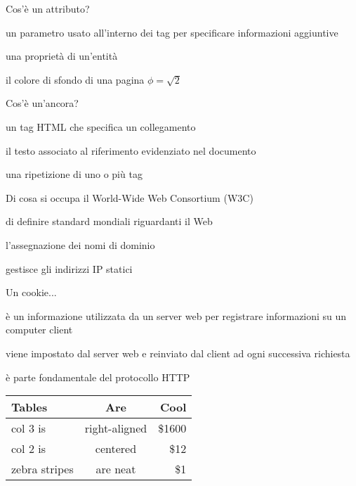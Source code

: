 \documentclass{omrexam}
\date{20/07/2019}
\begin{document}
\begin{questions}
\question
Cos'è un attributo? 
\begin{choices}

\choice 
un parametro usato all'interno dei tag per specificare informazioni aggiuntive

\choice 
una proprietà di un'entità

\choice 
il colore di sfondo di una pagina $\phi = \sqrt{2}$

\end{choices}
\question
Cos'è un'ancora? 
\begin{choices}

\choice 
un tag HTML che specifica un collegamento

\choice 
il testo associato al riferimento evidenziato nel documento

\choice 
una ripetizione di uno o più tag

\end{choices}
\question
Di cosa si occupa il World-Wide Web Consortium (W3C) 
\begin{choices}

\choice 
di definire standard mondiali riguardanti il Web

\choice 
l'assegnazione dei nomi di dominio

\choice 
gestisce gli indirizzi IP statici

\end{choices}
\question
Un cookie... 
\begin{choices}

\choice 
è un informazione utilizzata da un server web per registrare informazioni su un computer client

\choice 
viene impostato dal server web e reinviato dal client ad ogni successiva richiesta

\choice 
è parte fondamentale del protocollo HTTP

\end{choices}
\begin{tabular}{l c r}
Tables & Are & Cool \\
\hline
col 3 is & right-aligned & \$1600 \\
col 2 is & centered & \$12 \\
zebra stripes & are neat & \$1 \\
\end{tabular}

\end{questions}
\end{document}
